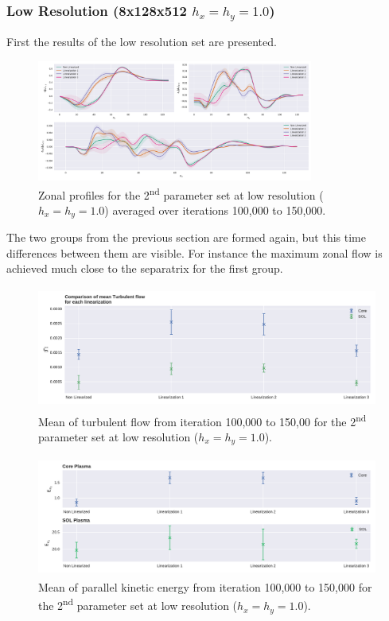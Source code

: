 \documentclass[master.tex]{subfiles}
\begin{document}
\subsubsection{Low Resolution (8x128x512 $h_x=h_y=1.0$)}

First the results of the low resolution set are presented.

\begin{figure}[!hbtp]
    \includegraphics[width=\linewidth, height=150px]{pdfs/0-2_0-96/zonal_profiles_100000.pdf}
    \caption{Zonal profiles for the 2\textsuperscript{nd} parameter set at low resolution ($h_x=h_y=1.0$) averaged over iterations 100,000 to 150,000.}
    \label{fig:zonal_profiles-low_for_high}
\end{figure}

The two groups from the previous section are formed again, but this time differences between them are visible. For instance the maximum zonal flow is achieved much close to the separatrix for the first group. 


\begin{figure}[!hbtp]
    \includegraphics[width=\linewidth, height=150px]{pdfs/0-2_0-96/turbulent_flow_means_100000.pdf}
    \caption{Mean of turbulent flow from iteration 100,000 to 150,00 for the 2\textsuperscript{nd} parameter set at low resolution ($h_x=h_y=1.0$).}
    \label{fig:turbulent-flow-means-high_good}
\end{figure}

\begin{figure}[!hbtp]
    \includegraphics[width=\linewidth, height=150px]{pdfs/0-2_0-96/parallelvelocity_mean_100000.pdf}
    \caption{Mean of parallel kinetic energy from iteration 100,000 to 150,000 for the 2\textsuperscript{nd} parameter set at low resolution ($h_x=h_y=1.0$).}
    \label{fig:velocity-energy-means-high_good}
\end{figure}
\end{document}
